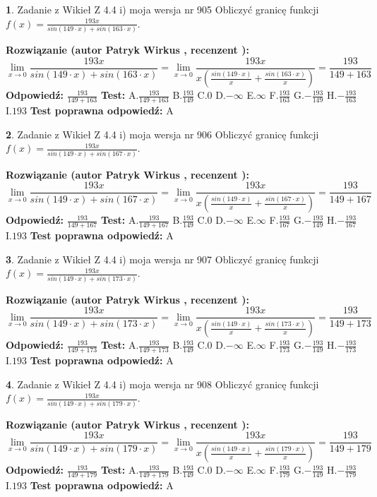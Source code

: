 \documentclass[12pt, a4paper]{article}
\theoremstyle{definition} %
\newtheorem{zad}{}
\newcommand{\zadStart}[1]{\begin{zad}#1\newline}
\newcommand{\zadStop}{\end{zad}}
\newcommand{\rozwStart}[2]{\noindent \textbf{Rozwiązanie (autor #1 , recenzent #2): }\newline}
\newcommand{\rozwStop}{\newline}
\newcommand{\odpStart}{\noindent \textbf{Odpowiedź:}\newline}
\newcommand{\odpStop}{\newline}
\newcommand{\testStart}{\noindent \textbf{Test:}\newline}
\newcommand{\testStop}{\newline}
\newcommand{\kluczStart}{\noindent \textbf{Test poprawna odpowiedź:}\newline}
\newcommand{\kluczStop}{\newline}
\begin{document}
\zadStart{Zadanie z Wikieł Z 4.4 i) moja wersja nr 905}
Obliczyć granicę funkcji $f(x)=\frac{193x}{sin(149\cdot x) +sin(163\cdot x)}$.
\zadStop
\rozwStart{Patryk Wirkus}{}
$$\lim\limits_{x\to 0}\frac{193x}{sin(149\cdot x) +sin(163\cdot x)}=\lim\limits_{x\to 0}\frac{193x}{x(\frac{sin(149\cdot x)}{x}+\frac{sin(163\cdot x)}{x})}=\frac{193}{149+163}$$
\rozwStop
\odpStart
$\frac{193}{149+163}$
\odpStop
\testStart
A.$\frac{193}{149+163}$
B.$\frac{193}{149}$
C.$0$
D.$-\infty$
E.$\infty$
F.$\frac{193}{163}$
G.$-\frac{193}{149}$
H.$-\frac{193}{163}$
I.$193$
\testStop
\kluczStart
A
\kluczStop



\zadStart{Zadanie z Wikieł Z 4.4 i) moja wersja nr 906}
Obliczyć granicę funkcji $f(x)=\frac{193x}{sin(149\cdot x) +sin(167\cdot x)}$.
\zadStop
\rozwStart{Patryk Wirkus}{}
$$\lim\limits_{x\to 0}\frac{193x}{sin(149\cdot x) +sin(167\cdot x)}=\lim\limits_{x\to 0}\frac{193x}{x(\frac{sin(149\cdot x)}{x}+\frac{sin(167\cdot x)}{x})}=\frac{193}{149+167}$$
\rozwStop
\odpStart
$\frac{193}{149+167}$
\odpStop
\testStart
A.$\frac{193}{149+167}$
B.$\frac{193}{149}$
C.$0$
D.$-\infty$
E.$\infty$
F.$\frac{193}{167}$
G.$-\frac{193}{149}$
H.$-\frac{193}{167}$
I.$193$
\testStop
\kluczStart
A
\kluczStop



\zadStart{Zadanie z Wikieł Z 4.4 i) moja wersja nr 907}
Obliczyć granicę funkcji $f(x)=\frac{193x}{sin(149\cdot x) +sin(173\cdot x)}$.
\zadStop
\rozwStart{Patryk Wirkus}{}
$$\lim\limits_{x\to 0}\frac{193x}{sin(149\cdot x) +sin(173\cdot x)}=\lim\limits_{x\to 0}\frac{193x}{x(\frac{sin(149\cdot x)}{x}+\frac{sin(173\cdot x)}{x})}=\frac{193}{149+173}$$
\rozwStop
\odpStart
$\frac{193}{149+173}$
\odpStop
\testStart
A.$\frac{193}{149+173}$
B.$\frac{193}{149}$
C.$0$
D.$-\infty$
E.$\infty$
F.$\frac{193}{173}$
G.$-\frac{193}{149}$
H.$-\frac{193}{173}$
I.$193$
\testStop
\kluczStart
A
\kluczStop



\zadStart{Zadanie z Wikieł Z 4.4 i) moja wersja nr 908}
Obliczyć granicę funkcji $f(x)=\frac{193x}{sin(149\cdot x) +sin(179\cdot x)}$.
\zadStop
\rozwStart{Patryk Wirkus}{}
$$\lim\limits_{x\to 0}\frac{193x}{sin(149\cdot x) +sin(179\cdot x)}=\lim\limits_{x\to 0}\frac{193x}{x(\frac{sin(149\cdot x)}{x}+\frac{sin(179\cdot x)}{x})}=\frac{193}{149+179}$$
\rozwStop
\odpStart
$\frac{193}{149+179}$
\odpStop
\testStart
A.$\frac{193}{149+179}$
B.$\frac{193}{149}$
C.$0$
D.$-\infty$
E.$\infty$
F.$\frac{193}{179}$
G.$-\frac{193}{149}$
H.$-\frac{193}{179}$
I.$193$
\testStop
\kluczStart
A
\kluczStop
\end{document}
